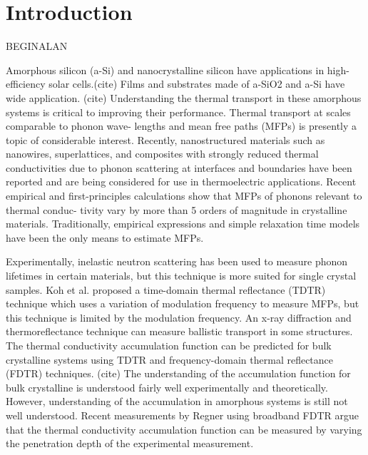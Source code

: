 \documentclass[aps,prb,twocolumn,superscriptaddress,footinbib,amsmath,amssymb,floatfix]{revtex4}
\begin{document}
\section{\label{S:Introduction}Introduction}

BEGINALAN

Amorphous silicon (a-Si) and nanocrystalline silicon have applications 
in high-efficiency solar cells.(cite) 
Films and substrates made of a-SiO2 and a-Si have wide application.
(cite) Understanding the thermal transport in these amorphous systems 
is critical to improving their performance. 
Thermal transport at scales comparable to phonon wave-
lengths and mean free paths (MFPs) is presently a topic of
considerable interest.\cite{cahill_nanoscale_2003,
yu_reduction_2010,hochbaum_enhanced_2008,pernot_precise_2010}
Recently, nanostructured materials
such as nanowires, superlattices, and composites with
strongly reduced thermal conductivities due to phonon
scattering at interfaces and boundaries have been reported
and are being considered for use in thermoelectric applications.
\cite{hochbaum_enhanced_2008,pernot_precise_2010,
boukai_silicon_2008,poudel_high-thermoelectric_2008}
Recent empirical and first-principles calculations
show that MFPs of phonons relevant to thermal conduc-
tivity vary by more than 5 orders of magnitude in crystalline 
materials.\cite{ward_intrinsic_2010}
Traditionally, empirical expressions and
simple relaxation time models have been the only means
to estimate MFPs.\cite{holland_analysis_1963} 

Experimentally, inelastic neutron scattering has been
used to measure phonon lifetimes in certain materials,
but this technique is more suited for single crystal samples.
\cite{christianson_phonon_2008} 
Koh et al. proposed a time-domain thermal reflectance (TDTR) 
technique which uses a variation of
modulation frequency to measure MFPs, but this technique
is limited by the modulation frequency.
\cite{koh_frequency_2007}
An x-ray diffraction and thermoreflectance technique
can measure ballistic transport in some structures.
\cite{highland_ballistic-phonon_2007}
The thermal conductivity accumulation function can be 
predicted for bulk crystalline systems using TDTR and 
frequency-domain thermal reflectance (FDTR) techniques.
(cite) 
The understanding of the accumulation function for bulk 
crystalline is understood fairly well experimentally
\cite{minnich_thermal_2011}
and 
theoretically.\cite{yang_mean_2013} However, understanding 
of the accumulation in amorphous systems is still not 
well understood.
\cite{feldman_thermal_1993,cahill_thermal_1994,
feldman_numerical_1999,liu_high_2009,yang_anomalously_2010,
he_thermal_2011}
Recent measurements by Regner using broadband FDTR 
argue that the thermal conductivity accumulation function 
can be measured by varying the penetration depth of the 
experimental measurement.\cite{regner_broadband_2013}
\end{document}
